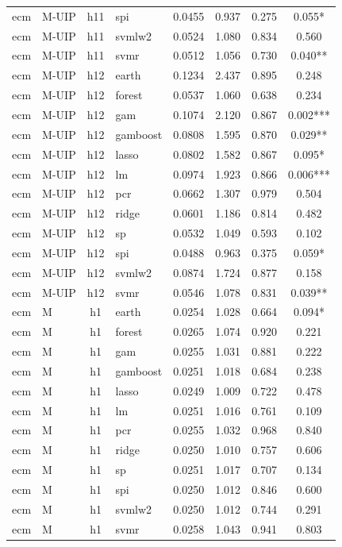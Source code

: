 \begin{ThreePartTable}
\begin{longtable}[t]{llclcccc}
ecm & M-UIP & h11 & spi & 0.0455 & 0.937 & 0.275 & 0.055*\\
ecm & M-UIP & h11 & svmlw2 & 0.0524 & 1.080 & 0.834 & 0.560\\
ecm & M-UIP & h11 & svmr & 0.0512 & 1.056 & 0.730 & 0.040**\\
\addlinespace
ecm & M-UIP & h12 & earth & 0.1234 & 2.437 & 0.895 & 0.248\\
ecm & M-UIP & h12 & forest & 0.0537 & 1.060 & 0.638 & 0.234\\
ecm & M-UIP & h12 & gam & 0.1074 & 2.120 & 0.867 & 0.002***\\
ecm & M-UIP & h12 & gamboost & 0.0808 & 1.595 & 0.870 & 0.029**\\
ecm & M-UIP & h12 & lasso & 0.0802 & 1.582 & 0.867 & 0.095*\\
ecm & M-UIP & h12 & lm & 0.0974 & 1.923 & 0.866 & 0.006***\\
ecm & M-UIP & h12 & pcr & 0.0662 & 1.307 & 0.979 & 0.504\\
ecm & M-UIP & h12 & ridge & 0.0601 & 1.186 & 0.814 & 0.482\\
ecm & M-UIP & h12 & sp & 0.0532 & 1.049 & 0.593 & 0.102\\
ecm & M-UIP & h12 & spi & 0.0488 & 0.963 & 0.375 & 0.059*\\
ecm & M-UIP & h12 & svmlw2 & 0.0874 & 1.724 & 0.877 & 0.158\\
ecm & M-UIP & h12 & svmr & 0.0546 & 1.078 & 0.831 & 0.039**\\
\addlinespace
ecm & M & h1 & earth & 0.0254 & 1.028 & 0.664 & 0.094*\\
ecm & M & h1 & forest & 0.0265 & 1.074 & 0.920 & 0.221\\
ecm & M & h1 & gam & 0.0255 & 1.031 & 0.881 & 0.222\\
ecm & M & h1 & gamboost & 0.0251 & 1.018 & 0.684 & 0.238\\
ecm & M & h1 & lasso & 0.0249 & 1.009 & 0.722 & 0.478\\
ecm & M & h1 & lm & 0.0251 & 1.016 & 0.761 & 0.109\\
ecm & M & h1 & pcr & 0.0255 & 1.032 & 0.968 & 0.840\\
ecm & M & h1 & ridge & 0.0250 & 1.010 & 0.757 & 0.606\\
ecm & M & h1 & sp & 0.0251 & 1.017 & 0.707 & 0.134\\
ecm & M & h1 & spi & 0.0250 & 1.012 & 0.846 & 0.600\\
ecm & M & h1 & svmlw2 & 0.0250 & 1.012 & 0.744 & 0.291\\
ecm & M & h1 & svmr & 0.0258 & 1.043 & 0.941 & 0.803\\

\end{longtable}
\end{ThreePartTable}
